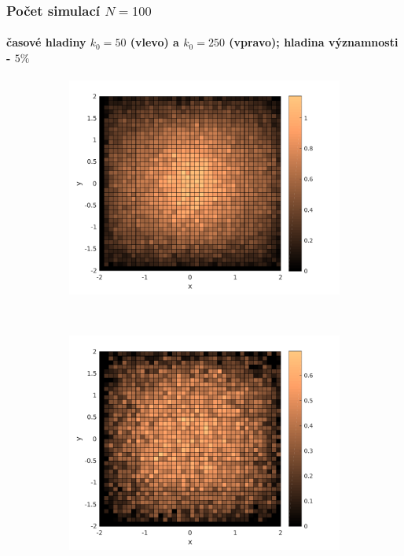 \begin{frame}\frametitle{Počet simulací $N=100$}
\framesubtitle{časové hladiny $k_{0}=50$ (vlevo) a $k_{0}=250$ (vpravo); hladina významnosti - $5 \%$}
\begin{figure}
    \centering
    \begin{subfigure}[t]{0.5\textwidth}
        \centering
        \includegraphics[width=1\linewidth]{../../results/simulations/100/solutionErr/solutionError_sim100_step01_time50_boundary2.pdf}
    \end{subfigure}%
    ~ 
    \begin{subfigure}[t]{0.5\textwidth}
        \centering
        \includegraphics[width=1\linewidth]{../../results/simulations/100/solutionErr/solutionError_sim100_step01_time250_boundary2.pdf}
    \end{subfigure}
\end{figure}
\end{frame}

